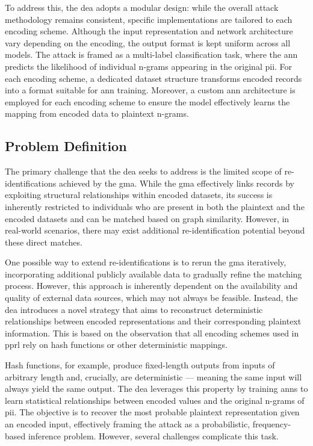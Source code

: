 To address this, the \ac{dea} adopts a modular design: while the overall attack methodology remains consistent, specific implementations are tailored to each encoding scheme.
Although the input representation and network architecture vary depending on the encoding, the output format is kept uniform across all models.
The attack is framed as a multi-label classification task, where the \ac{ann} predicts the likelihood of individual n-grams appearing in the original \ac{pii}.
For each encoding scheme, a dedicated dataset structure transforms encoded records into a format suitable for \ac{ann} training.
Moreover, a custom \ac{ann} architecture is employed for each encoding scheme to ensure the model effectively learns the mapping from encoded data to plaintext n-grams.


\subsection{Problem Definition} \label{sec:problemdefinition}

The primary challenge that the \ac{dea} seeks to address is the limited scope of re-identifications achieved by the \ac{gma}.
While the \ac{gma} effectively links records by exploiting structural relationships within encoded datasets, its success is inherently restricted to individuals who are present in both the plaintext and the encoded datasets and can be matched based on graph similarity.
However, in real-world scenarios, there may exist additional re-identification potential beyond these direct matches.

One possible way to extend re-identifications is to rerun the \ac{gma} iteratively, incorporating additional publicly available data to gradually refine the matching process.
However, this approach is inherently dependent on the availability and quality of external data sources, which may not always be feasible.
Instead, the \ac{dea} introduces a novel strategy that aims to reconstruct deterministic relationships between encoded representations and their corresponding plaintext information.
This is based on the observation that all encoding schemes used in \ac{pprl} rely on hash functions or other deterministic mappings.

Hash functions, for example, produce fixed-length outputs from inputs of arbitrary length and, crucially, are deterministic — meaning the same input will always yield the same output.
The \ac{dea} leverages this property by training \ac{ann}s to learn statistical relationships between encoded values and the original n-grams of \ac{pii}.
The objective is to recover the most probable plaintext representation given an encoded input, effectively framing the attack as a probabilistic, frequency-based inference problem.
However, several challenges complicate this task.

